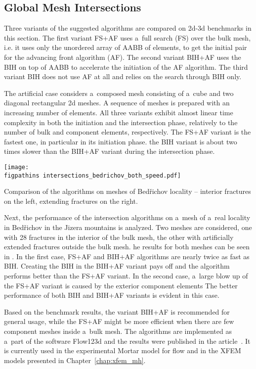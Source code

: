 \subsection{Global Mesh Intersections}
Three variants of the suggested algorithms are compared on 2d-3d benchmarks in this section.
The first variant FS+AF uses a~full search (FS) over the bulk mesh, i.e. it uses only the unordered array of AABB of elements,
to get the initial pair for the advancing front algorithm (AF).
The second variant BIH+AF uses the BIH on top of AABB to accelerate the initiation of the AF algorithm.
The third variant BIH does not use AF at all and relies on the search through BIH only. 

The artificial case considers a~composed mesh consisting of a~cube and two diagonal rectangular 2d meshes.
A sequence of meshes is prepared with an increasing number of elements.
All three variants exhibit almost linear time complexity in both the initiation and the intersection phase,
relatively to the number of bulk and component elements, respectively.
The FS+AF variant is the fastest one, in particular in its initiation phase.
the BIH variant is about two times slower than the BIH+AF variant during the intersection phase. 

\begin{graph}[!htb]
    \centering
    \texttt{[image: \\figpathins intersections\_bedrichov\_both\_speed.pdf]}
    \caption[Comparison of the algorithms on meshes of Bed{\v r}ichov locality.]
    {Comparison of the algorithms on meshes of Bed{\v r}ichov locality -- 
        interior fractures on the left,
        extending fractures on the right.}
    \label{graph:bedrichov_speed}
\end{graph}
%
Next, the performance of the intersection algorithms on a~mesh of a~real locality in Bed{\v r}ichov in the Jizera mountains
is analyzed. Two meshes are considered, one with 28 fractures in the interior of the bulk mesh, 
the other with artificially extended fractures outside the bulk mesh.
he results for both meshes can be seen in .
In the first case, FS+AF and BIH+AF algorithms are nearly twice as fast as BIH.
Creating the BIH in the BIH+AF variant pays off and the algorithm performs better than the FS+AF variant.
In the second case, a~large blow up of the FS+AF variant is caused by the exterior component elements
The better performance of both BIH and BIH+AF variants is evident in this case.


Based on the benchmark results, the variant BIH+AF is recommended for general usage,
while the FS+AF might be more efficient when there are few component meshes inside a~bulk mesh.
The algorithms are implemented as a~part of the software Flow123d and the results were published in the article~\cite{brezina_2017}.
It is currently used in the experimental Mortar model for flow and in the XFEM models presented in Chapter~\ref{chap:xfem_mh}.


